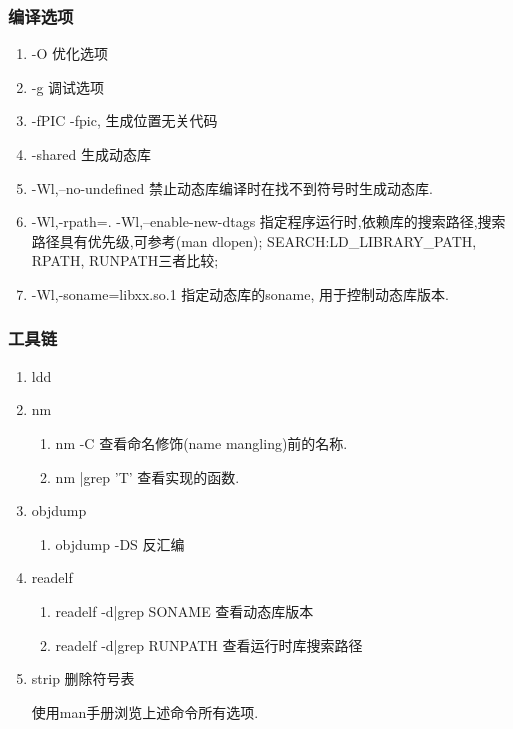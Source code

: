 \begin{frame}
\frametitle{编译选项}
        
\begin{enumerate}
\item -O 优化选项
\item -g 调试选项
\item -fPIC -fpic, 生成位置无关代码
\item -shared 生成动态库
\item -Wl,--no-undefined  禁止动态库编译时在找不到符号时生成动态库.
\item -Wl,-rpath=. -Wl,--enable-new-dtags 
        指定程序运行时,依赖库的搜索路径,搜索路径具有优先级,可参考(man dlopen);
        SEARCH:LD_LIBRARY_PATH, RPATH, RUNPATH三者比较;
\item -Wl,-soname=libxx.so.1
        指定动态库的soname, 用于控制动态库版本.
\end{enumerate}
\end{frame}

\begin{frame}
\frametitle{工具链}

\begin{enumerate}
\item ldd
\item nm
        \begin{enumerate}
        \item  nm -C
                查看命名修饰(name mangling)前的名称.
        \item  nm |grep '\<T\>'
                查看实现的函数.
        \end{enumerate}
\item objdump
        \begin{enumerate}
        \item  objdump -DS
                反汇编
        \end{enumerate}
\item readelf
        \begin{enumerate}
        \item  readelf -d|grep SONAME
                查看动态库版本
        \item  readelf -d|grep RUNPATH
                 查看运行时库搜索路径
        \end{enumerate}
\item strip
        删除符号表        

使用man手册浏览上述命令所有选项.
\end{enumerate}
\end{frame}

